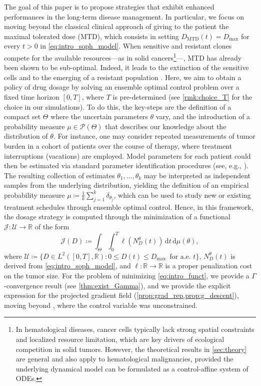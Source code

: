 \documentclass[a4paper,12pt, reqno]{amsart}
\theoremstyle{plain}
\theoremstyle{definition}
\theoremstyle{remark}
\numberwithin{equation}{section}
\newcommand{\J}{\mathcal{J}}
\newcommand{\R}{\mathbb{R}}
\newcommand{\U}{\mathcal{U}}
\newcommand{\de}{\,\mathrm{d}}
\begin{document}
The goal {of this paper} is to propose strategies that exhibit enhanced performances in the long-term disease management. In particular, we focus on moving beyond the classical clinical approach of giving to the patient the maximal tolerated dose (MTD), which consists in setting ${D}_{\mathrm{MTD}}(t) = {D_{\max}}$ for every $t>0$ in \cref{eq:intro_soph_model}.
When sensitive and resistant clones compete for the available resources---as in solid cancers\footnote{{In hematological diseases, cancer cells typically lack strong spatial constraints and localized resource limitation, which are key drivers of ecological competition in solid tumors. However, the theoretical results in \cref{sec:theory} are general and also apply to hematological malignancies, provided the underlying dynamical model can be formulated as a control-affine system of ODEs.}}---, MTD has already been shown to be sub-optimal. Indeed, it leads to the extinction of the sensitive cells and to the emerging of a resistant population \cite{moff2012evolutionary}.  
Here, we aim to obtain a policy of drug dosage by solving an ensemble optimal control problem over {a fixed} time horizon $[0,T]${, where $T$ is pre-determined (see \cref{rmk:choice_T} for the choice in our simulations)}.
To do this, the key-steps are the definition of a compact set $\Theta$ where the {uncertain} parameters $\theta$ vary, and the introduction of a probability measure $\mu \in \mathcal{P}(\Theta)$ that describes our knowledge about the distribution of $\theta$. {For instance, one may consider repeated measurements of tumor burden in a cohort of patients over the course of therapy, where treatment interruptions (vacations) are employed. Model parameters for each patient could then be estimated via standard parameter identification procedures (see, e.g., \cite{Nelles2020}). The resulting collection of estimates $\theta_1,\ldots,\theta_k$ may be interpreted as independent samples from the underlying distribution, yielding the definition of an empirical probability measure $\mu\coloneqq \frac1k \sum_{j=1}^k \delta_{\theta_j}$,  which can be used to study new or existing treatment schedules through ensemble optimal control. Hence, in this framework}, the dosage strategy is computed through the minimization of a functional $\J\colon \U\to\R$ of the form
\begin{equation} \label{eq:intro_funct}
    \J({D}) \coloneqq  
    \int_\Theta  \int_0^T \ell\left( {N_D^\theta(t)} \right)  
    \de {t} \de\mu(\theta),
\end{equation}
where $\U\coloneqq \{{D} \in L^2([0,T],\R): 0\leq {D(t)}\leq {D_{\max}} \, \mbox{ for a.e. } {t}\}$, ${N_D^\theta(t)}$ is derived from \cref{eq:intro_soph_model}, and $\ell\colon \R\to\R$ is a proper penalization cost on the tumor size. {For the problem of minimizing \eqref{eq:intro_funct}, we provide a $\Gamma$-convergence result (see \cref{thm:exist_Gamma}), and we provide the explicit expression for the projected gradient field (\cref{prop:grad_rep,prop:g_descent}), moving beyond \cite{scag23gf,Scag23}, where the control variable was unconstrained.}
\end{document}
